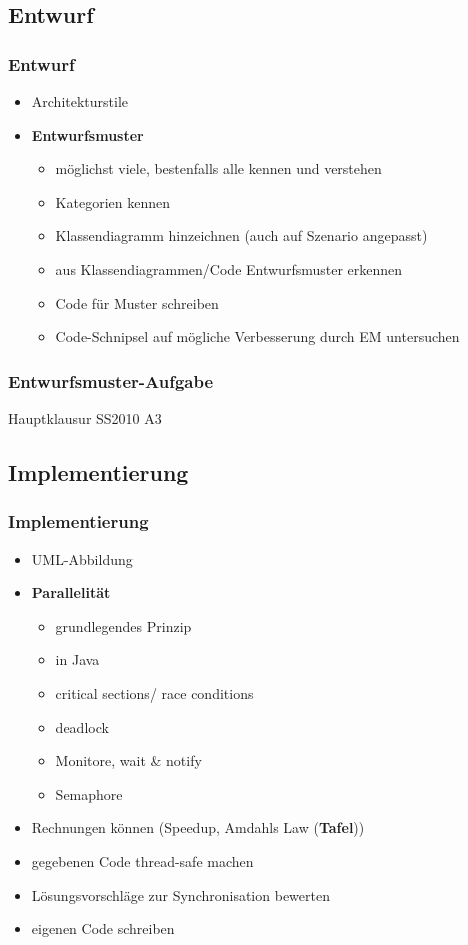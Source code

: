\documentclass[18pt]{beamer}
\begin{document}
	\subsection{Entwurf}
	\begin{frame}
		\frametitle{Entwurf}
		\begin{itemize}
			\item Architekturstile \pause
			\item \textbf{Entwurfsmuster} \pause
			\begin{itemize}
				\item möglichst viele, bestenfalls alle kennen und verstehen \pause
				\item Kategorien kennen \pause
				\item Klassendiagramm hinzeichnen (auch auf Szenario angepasst) \pause
				\item aus Klassendiagrammen/Code Entwurfsmuster erkennen \pause
				\item Code für Muster schreiben \pause
				\item Code-Schnipsel auf mögliche Verbesserung durch EM untersuchen
			\end{itemize}
		\end{itemize}
	\end{frame}

	\begin{frame}
		\frametitle{Entwurfsmuster-Aufgabe}
		\begin{huge}
				\centering Hauptklausur SS2010 A3
		\end{huge}
	\end{frame}

	
	\subsection{Implementierung}
	\begin{frame}
		\frametitle{Implementierung}
		\begin{itemize}
			\item UML-Abbildung \pause
			\item \textbf{Parallelität} \pause
			\begin{itemize}
				\item grundlegendes Prinzip \pause
				\item in Java \pause
				\item critical sections/ race conditions \pause
				\item deadlock \pause
				\item Monitore, wait \& notify \pause
				\item Semaphore \pause
			\end{itemize}
			\item Rechnungen können (Speedup, Amdahls Law (\textbf{Tafel})) \pause
			\item gegebenen Code thread-safe machen \pause
			\item Lösungsvorschläge zur Synchronisation bewerten \pause
			\item eigenen Code schreiben
		\end{itemize}
	\end{frame}
\end{document}
